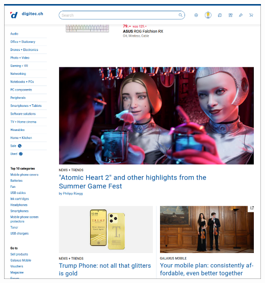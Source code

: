 \documentclass[10pt]{article}
\begin{document}
	\includegraphics[width=17cm]{DigitechHomepage}\\\\
	
\end{document}
